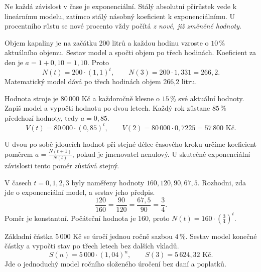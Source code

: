 \documentclass[11pt,a4paper]{article}
\begin{document}
Ne každá závislost v čase je exponenciální. Stálý absolutní přírůstek vede k lineárnímu modelu, zatímco stálý násobný koeficient k exponenciálnímu. U procentního růstu se nové procento vždy počítá \emph{z nové, již změněné hodnoty}.
\begin{prikladReseniBox}[title={Příklad 1}]
Objem kapaliny je na začátku 200 litrů a každou hodinu vzroste o $10\,\%$ aktuálního objemu. Sestav model a spočti objem po třech hodinách.
\tcblower
Koeficient za den je $a=1+0{,}10=1{,}10$. Proto
\[
N(t)=200\cdot(1{,}1)^t,\qquad N(3)=200\cdot1{,}331=266{,}2.
\]
Matematický model dává po třech hodinách objem 266{,}2 litru.
\end{prikladReseniBox}
\begin{prikladReseniBox}[title={Příklad 2}]
Hodnota stroje je 80\,000 Kč a každoročně klesne o $15\,\%$ své aktuální hodnoty. Zapiš model a vypočti hodnotu po dvou letech.
\tcblower
Každý rok zůstane $85\,\%$ předchozí hodnoty, tedy $a=0{,}85$.
\[
V(t)=80\,000\cdot(0{,}85)^t,\qquad V(2)=80\,000\cdot0{,}7225=57\,800\text{ Kč}.
\]
\end{prikladReseniBox}
U dvou po sobě jdoucích hodnot při stejné délce časového kroku určíme koeficient poměrem $a=\frac{N(t+1)}{N(t)}$, pokud je jmenovatel nenulový. U skutečné exponenciální závislosti tento poměr zůstává stejný.
\begin{prikladReseniBox}[title={Příklad 3}]
V časech $t=0,1,2,3$ byly naměřeny hodnoty $160,120,90,67{,}5$. Rozhodni, zda jde o exponenciální model, a sestav jeho předpis.
\tcblower
\[
\frac{120}{160}=\frac{90}{120}=\frac{67{,}5}{90}=\frac{3}{4}.
\]
Poměr je konstantní. Počáteční hodnota je 160, proto $N(t)=160\cdot\left(\frac{3}{4}\right)^t$.
\end{prikladReseniBox}
\begin{prikladReseniBox}[title={Příklad 4}]
Základní částka 5\,000 Kč se úročí jednou ročně sazbou $4\,\%$. Sestav model konečné částky a vypočti stav po třech letech bez dalších vkladů.
\tcblower
\[
S(n)=5\,000\cdot(1{,}04)^n,\qquad S(3)=5\,624{,}32\text{ Kč}.
\]
Jde o jednoduchý model ročního složeného úročení bez daní a poplatků.
\end{prikladReseniBox}
\end{document}
